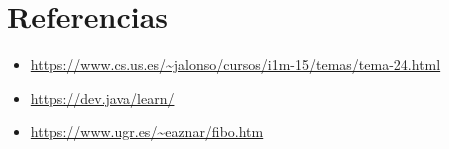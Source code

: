 \documentclass{article}
\begin{document}
    \section{Referencias}
    
    \begin{itemize}			
    	\item \url{https://www.cs.us.es/~jalonso/cursos/i1m-15/temas/tema-24.html}
    	\item \url{https://dev.java/learn/}
    	\item \url{https://www.ugr.es/~eaznar/fibo.htm}     
    \end{itemize}	

\end{document}
